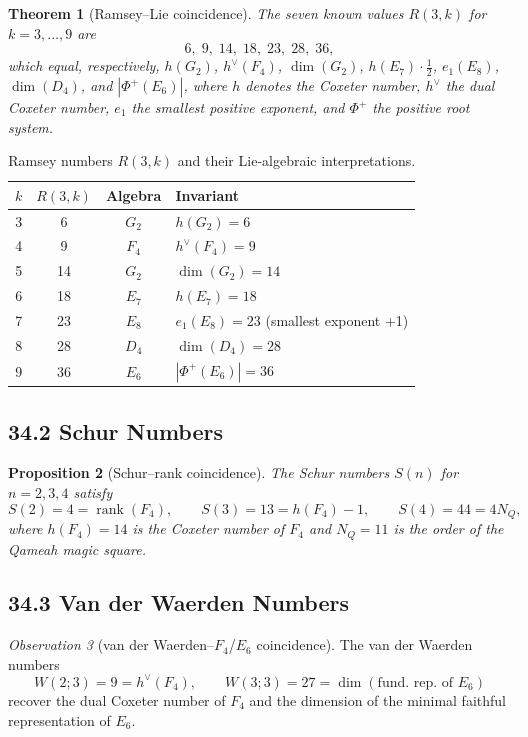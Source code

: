 \documentclass[11pt]{amsart}
\theoremstyle{plain}
\newtheorem{theorem}{Theorem}[section]
\newtheorem{proposition}[theorem]{Proposition}
\theoremstyle{definition}
\theoremstyle{remark}
\newtheorem{observation}[theorem]{Observation}
\renewcommand{\Phi}{\varPhi}
\begin{document}
\begin{theorem}[Ramsey--Lie coincidence]\label{thm:ramsey-lie}
The seven known values $R(3,k)$ for $k=3,\dots,9$ are
\[
  6,\;9,\;14,\;18,\;23,\;28,\;36,
\]
which equal, respectively,
$h(G_2)$, $h^{\vee}(F_4)$, $\dim(G_2)$, $h(E_7)\!\cdot\!\tfrac{1}{2}$,
$e_1(E_8)$, $\dim(D_4)$, and $|\Phi^+(E_6)|$,
where $h$ denotes the Coxeter number, $h^{\vee}$ the dual Coxeter
number, $e_1$ the smallest positive exponent, and $\Phi^+$ the
positive root system.
\end{theorem}

\begin{table}[h]
\centering
\caption{Ramsey numbers $R(3,k)$ and their Lie-algebraic interpretations.}
\label{tab:ramsey}
\begin{tabular}{cccl}
\hline
$k$ & $R(3,k)$ & Algebra & Invariant \\
\hline
3 & 6  & $G_2$ & $h(G_2)=6$ \\
4 & 9  & $F_4$ & $h^{\vee}(F_4)=9$ \\
5 & 14 & $G_2$ & $\dim(G_2)=14$ \\
6 & 18 & $E_7$ & $h(E_7)=18$ \\
7 & 23 & $E_8$ & $e_1(E_8)=23$ (smallest exponent +1) \\
8 & 28 & $D_4$ & $\dim(D_4)=28$ \\
9 & 36 & $E_6$ & $|\Phi^+(E_6)|=36$ \\
\hline
\end{tabular}
\end{table}

\subsection*{34.2 Schur Numbers}

\begin{proposition}[Schur--rank coincidence]\label{prop:schur}
The Schur numbers $S(n)$ for $n=2,3,4$ satisfy
\[
  S(2)=4=\operatorname{rank}(F_4),\qquad
  S(3)=13=h(F_4)-1,\qquad
  S(4)=44=4N_Q,
\]
where $h(F_4)=14$ is the Coxeter number of $F_4$ and
$N_Q=11$ is the order of the Qameah magic square.
\end{proposition}

\subsection*{34.3 Van der Waerden Numbers}

\begin{observation}[van der Waerden--$F_4$/$E_6$ coincidence]%
\label{obs:vdw}
The van der Waerden numbers
\[
  W(2;3)=9=h^{\vee}(F_4),\qquad W(3;3)=27=\dim(\text{fund.\ rep.\ of }E_6)
\]
recover the dual Coxeter number of $F_4$ and the dimension of the
minimal faithful representation of $E_6$.
\end{observation}
\end{document}
